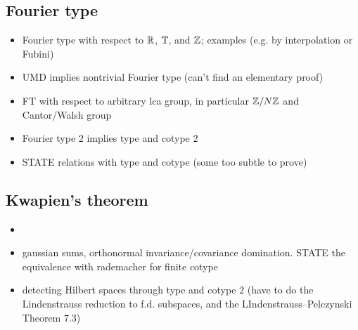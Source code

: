 

\subsection{Fourier type}

\begin{itemize}
\item Fourier type with respect to $\mathbb{R}$, $\mathbb{T}$, and $\mathbb{Z}$; examples (e.g. by interpolation or Fubini)
\item UMD implies nontrivial Fourier type (can't find an elementary proof)
\item FT with respect to arbitrary lca group, in particular $\mathbb{Z}/N\mathbb{Z}$ and Cantor/Walsh group
\item Fourier type $2$ implies type and cotype $2$
\item STATE relations with type and cotype (some too subtle to prove)
\end{itemize}

\subsection{Kwapien's theorem}

\begin{itemize}
\item \item gaussian sums, orthonormal invariance/covariance
  domination. STATE the equivalence with rademacher for finite cotype
\item detecting Hilbert spaces through type and cotype $2$ (have to do the Lindenstrauss reduction to f.d. subspaces, and the LIndenstrauss--Pelczynski Theorem 7.3)
\end{itemize}


